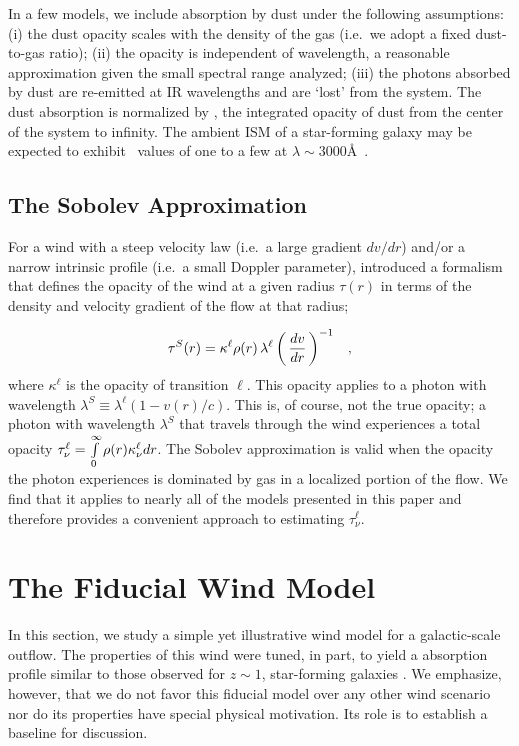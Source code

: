 \documentclass[12pt,preprint]{aastex}
\begin{document}
In a few models, we include absorption by dust under the following
assumptions:
(i) the dust opacity scales with the density of the gas (i.e.\ we
adopt a fixed dust-to-gas ratio);
(ii) the opacity is independent of wavelength, a reasonable
approximation given the small spectral range analyzed;
(iii) the photons absorbed by dust are re-emitted at IR wavelengths
and are `lost' from the system.  The dust absorption is normalized by \taud, 
the integrated opacity of dust from the center of the system to
infinity.  The ambient ISM of a star-forming galaxy may be expected to exhibit
\taud\ values of one to a few at $\lambda \sim 3000$\AA\ \citep[e.g.][]{dust_again,cf00}.

\subsection{The Sobolev Approximation}

For a wind with a steep velocity law (i.e.\ a large gradient $dv/dr$)
and/or a narrow intrinsic profile (i.e.\ a small Doppler parameter),
\citet{sobolev60} introduced a formalism that defines the opacity of
the wind at a given radius $\tau(r)$ in terms of the density and
velocity gradient of the flow at that radius;

\begin{equation}
\tau^S(r) = \kappa^\ell \rho(r) \, \lambda^\ell \left ( \, \frac{dv}{dr} 
\, \right )^{-1}  \;\;\; ,
\label{eqn:Sobolev}
\end{equation}
where $\kappa^\ell$ is the opacity of transition $\ell$.  This opacity
applies to a photon with wavelength $\lambda^S
\equiv \lambda^\ell (1-v(r)/c)$.
This is, of course, not the true opacity;
a photon with wavelength $\lambda^S$ that travels through the wind 
experiences a total opacity 
$\tau_\nu^\ell = \int\limits_0^\infty \rho(r) \kappa_\nu^\ell dr$.  The Sobolev
approximation is valid when the opacity the photon experiences is
dominated by gas in a localized portion of the flow.
We find that it applies to nearly all of the
models presented in this paper and therefore provides a convenient
approach to estimating $\tau^\ell_\nu$.



\section{The Fiducial Wind Model}
\label{sec:fiducial}

In this section, we study a simple yet illustrative wind model for
a galactic-scale outflow.  The properties of this wind were tuned, in
part, to yield a  absorption profile 
similar to those observed for $z \sim 1$, star-forming galaxies
\citep{wcp+09,rubin+10c}.  We emphasize, however, that we do not
favor this fiducial model over any other wind scenario nor do its
properties have special physical motivation.
Its role is to establish a baseline
for discussion.
\end{document}
